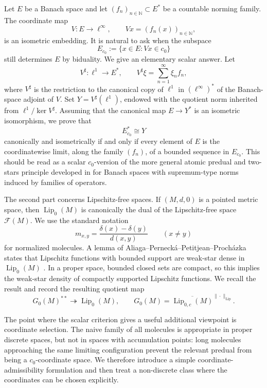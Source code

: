 \documentclass[11pt]{amsart}
\theoremstyle{plain}
\theoremstyle{definition}
\theoremstyle{remark}
\newcommand{\Lip}{\operatorname{Lip}}
\newcommand{\F}{\mathcal F}
\newcommand{\N}{\mathbb N}
\begin{document}
Let $E$ be a Banach space and let $(f_n)_{n\in\N}\subset E^*$ be a
countable norming family. The coordinate map
\[
        V:E\longrightarrow \ell^\infty,\qquad Vx=(f_n(x))_{n\in\N},
\]
is an isometric embedding. It is natural to ask when the subspace
\[
        E_{c_0}:=\{x\in E:Vx\in c_0\}
\]
still determines $E$ by biduality. We give an elementary scalar answer. Let
\[
        V^\sharp:\ell^1\longrightarrow E^*,\qquad
        V^\sharp \xi=\sum_{n=1}^\infty \xi_n f_n,
\]
where $V^\sharp$ is the restriction to the canonical copy of $\ell^1$ in
$(\ell^\infty)^*$ of the Banach-space adjoint of $V$. Set
$Y=V^\sharp(\ell^1)$, endowed with the quotient norm inherited from
$\ell^1/\ker V^\sharp$. Assuming that the canonical map $E\to Y^*$ is an
isometric isomorphism, we prove that
\[
        E_{c_0}^*\cong Y
\]
canonically and isometrically if and only if every element of $E$ is the
coordinatewise limit, along the family $(f_n)$, of a bounded sequence in
$E_{c_0}$. This should be read as a scalar $c_0$-version of the more general
atomic predual and two-stars principle developed in \cite{DGPSS20} for
Banach spaces with supremum-type norms induced by families of operators.

The second part concerns Lipschitz-free spaces. If $(M,d,0)$ is a pointed
metric space, then $\Lip_0(M)$ is canonically the dual of the Lipschitz-free
space $\F(M)$. We use the standard notation
\[
        m_{x,y}=\frac{\delta(x)-\delta(y)}{d(x,y)}\qquad (x\ne y)
\]
for normalized molecules. A lemma of
Aliaga--Perneck\'a--Petitjean--Proch\'azka states that Lipschitz functions
with bounded support are weak-star dense in $\Lip_0(M)$ \cite[Lemma
2.2]{APPP20}. In a proper space, bounded closed sets are compact, so this
implies the weak-star density of compactly supported Lipschitz functions.
We recall the result and record the resulting quotient map
\[
        G_0(M)^{**}\twoheadrightarrow \Lip_0(M),
        \qquad
        G_0(M)=\overline{\Lip_{0,c}(M)}^{\|\cdot\|_{\Lip}}.
\]

The point where the scalar criterion gives a useful additional viewpoint is
coordinate selection. The naive family of all molecules is appropriate in
proper discrete spaces, but not in spaces with accumulation points: long
molecules approaching the same limiting configuration prevent the relevant
predual from being a $c_0$-coordinate space. We therefore introduce a simple
coordinate-admissibility formulation and then treat a non-discrete class
where the coordinates can be chosen explicitly.
\end{document}
